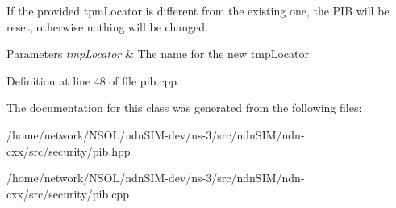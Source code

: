If the provided {\ttfamily tpm\+Locator} is different from the existing one, the P\+IB will be reset, otherwise nothing will be changed.


\begin{DoxyParams}{Parameters}
{\em tmp\+Locator} & The name for the new tmp\+Locator \\
\hline
\end{DoxyParams}


Definition at line 48 of file pib.\+cpp.



The documentation for this class was generated from the following files\+:\begin{DoxyCompactItemize}
\item 
/home/network/\+N\+S\+O\+L/ndn\+S\+I\+M-\/dev/ns-\/3/src/ndn\+S\+I\+M/ndn-\/cxx/src/security/pib.\+hpp\item 
/home/network/\+N\+S\+O\+L/ndn\+S\+I\+M-\/dev/ns-\/3/src/ndn\+S\+I\+M/ndn-\/cxx/src/security/pib.\+cpp\end{DoxyCompactItemize}
